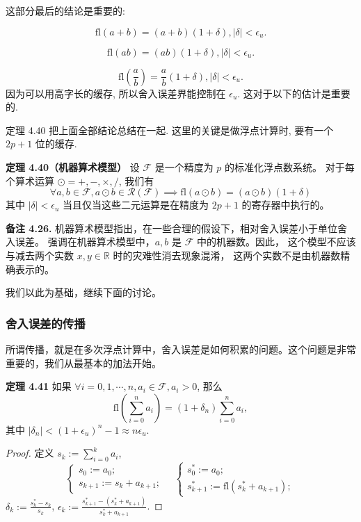 \documentclass[a4paper]{ctexart}
\begin{document}
{%

这部分最后的结论是重要的:

$$
\mbox{fl}(a + b) = (a + b)(1 + \delta), |\delta| < \epsilon_u.
$$

$$
\mbox{fl}(ab) = (ab)(1 + \delta), |\delta| < \epsilon_u.
$$

$$
\mbox{fl}(\frac{a}{b}) = \frac{a}{b}(1 + \delta), |\delta| < \epsilon_u.
$$
因为可以用高字长的缓存, 所以舍入误差界能控制在 $\epsilon_u$.
这对于以下的估计是重要的. 

定理 4.40 把上面全部结论总结在一起. 这里的关键是做浮点计算时,
要有一个 $2p + 1$ 位的缓存.

\noindent \textbf{定理 4.40（机器算术模型） } 设 $\mathcal{F}$ 是一个精度为 $p$ 的标准化浮点数系统。
对于每个算术运算 $\odot = +, -, \times, /$, 我们有
\[
  \forall a, b \in \mathcal{F}, a \odot b \in \mathcal{R}(\mathcal{F}) \implies \text{fl}(a \odot b) = (a \odot b)(1 + \delta) \tag{4.19}
\]
其中 $|\delta| < \epsilon_u$ 当且仅当这些二元运算是在精度为 $2p + 1$ 的寄存器中执行的。

\noindent \textbf{备注 4.26.} 机器算术模型指出，在一些合理的假设下，相对舍入误差小于单位舍入误差。
强调在机器算术模型中，$a, b$ 是 $\mathcal{F}$ 中的机器数。因此，
这个模型不应该与减去两个实数 $x, y \in \mathbb{R}$ 时的灾难性消去现象混淆，
这两个实数不是由机器数精确表示的。

我们以此为基础，继续下面的讨论。

\subsubsection{舍入误差的传播}

所谓传播，就是在多次浮点计算中，舍入误差是如何积累的问题。这个问题是非常重要的，我们从最基本的加法开始。

\noindent \textbf{定理 4.41 } 如果 $\forall i = 0, 1, \cdots, n, a_i \in \mathcal{F}, a_i > 0$, 那么
\[
  \text{fl}\left(\sum_{i=0}^{n} a_i\right) = (1 + \delta_n) \sum_{i=0}^{n} a_i, \tag{4.20}
\]
其中 $|\delta_n| < (1 + \epsilon_u)^n - 1 \approx n\epsilon_u$.

\begin{proof}
定义 $s_k := \sum_{i=0}^{k} a_i$,
\[
  \begin{cases}
    s_0 := a_0; \\
    s_{k+1} := s_k + a_{k+1};
  \end{cases}
  \quad
  \begin{cases}
    s_0^* := a_0; \\
    s_{k+1}^* := \text{fl}(s_k^* + a_{k+1});
  \end{cases}
\]
$\delta_k := \frac{s_k^* - s_k}{s_k}$, $\epsilon_k := \frac{s_{k+1}^* - (s_k^* + a_{k+1})}{s_k^* + a_{k+1}}$.


\end{proof}}
\end{document}
